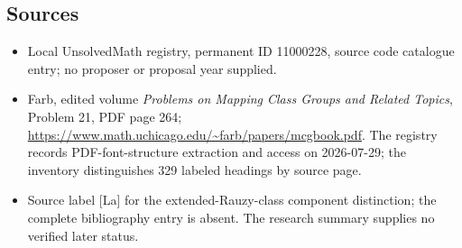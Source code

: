 \documentclass[11pt]{article}
\begin{document}
\subsection{Sources}
\begin{itemize}
\item Local UnsolvedMath registry, permanent ID 11000228, source code catalogue entry; no proposer or proposal year supplied.
\item Farb, edited volume \emph{Problems on Mapping Class Groups and Related Topics}, Problem 21, PDF page 264; \url{https://www.math.uchicago.edu/~farb/papers/mcgbook.pdf}. The registry records PDF-font-structure extraction and access on 2026-07-29; the inventory distinguishes 329 labeled headings by source page.
\item Source label [La] for the extended-Rauzy-class component distinction; the complete bibliography entry is absent. The research summary supplies no verified later status.
\end{itemize}
\end{document}
